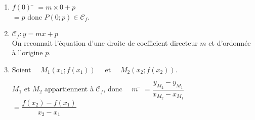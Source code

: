 \documentclass[a4paper,11pt,cours]{nsi}
\begin{document}
\begin{demonstration}
	\begin{enumerate}[label=\textbullet]
		\item 	\begin{tabbing}
			$f(0)$ 	\=  $= m\times 0+p $\\
			\>  $= p$ \hspace*{2cm} donc $P(0;p) \in \mathcal{C}_f$.
		\end{tabbing}
		\item 	$\mathcal{C}_f : y=mx+p$\\
			On reconnait l'équation d'une droite de coefficient directeur $m$ et d'ordonnée à l'origine $p$.
		\item	Soient $\quad M_1(x_1;f(x_1))\quad$ et $\quad M_2(x_2;f(x_2))$.
		\begin{tabbing}
			$M_1$ et $M_2$ appartiennent à $\mathcal{C}_f$, donc $\quad m $ 	\=  $=\dfrac{y_{M_2}-y_{M_1}}{x_{M_2}-x_{M_1}} $\\[.7em]
			\>  $= \dfrac{f(x_2)-f(x_1)}{x_2-x_1}$
		\end{tabbing}
		
	\end{enumerate}
\end{demonstration}
\end{document}
